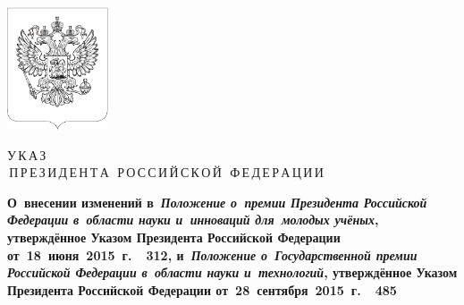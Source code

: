 \documentclass[12pt, a4paper]{extarticle}
\begin{document}
\begin{center}
	\thispagestyle{empty}
	
	\vspace*{-35mm}
	\vspace*{10mm}
	
	\includegraphics[width=3cm]{./emblem_black_bordered} \medskip
	
	\setBold[.5]
	\huge{У}\Large{\,К\,А\,З} \\\medskip
	\Large{\,П}\normalsize \,Р\,Е\,З\,И\,Д\,Е\,Н\,Т\,А\, 
	\Large{\,Р}\normalsize \,О\,С\,С\,И\,Й\,С\,К\,О\,Й\,
	\Large{\,Ф}\normalsize \,Е\,Д\,Е\,Р\,А\,Ц\,И\,И 
	\unsetBold
	
	\bigskip
	
	{
		\bfseries
		\normalsize
		О~внесении изменений в~\emph{Положение о~премии Президента Российской Федерации в~области науки и~инноваций для~молодых учёных}, утверждённое Указом Президента Российской Федерации от~18~июня~2015~г.~\textnumero~312, и~\emph{Положение о~Государственной премии Российской Федерации в~области науки и~технологий}, утверждённое Указом Президента Российской Федерации от~28~сентября~2015~г.~\textnumero~485
	}
	
\end{center}
\end{document}
